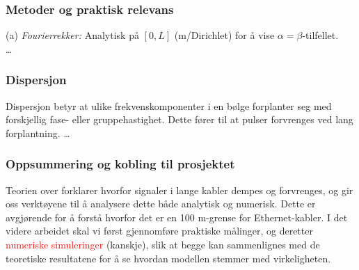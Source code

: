 \subsubsection{Metoder og praktisk relevans}

(a) \textit{Fourierrekker:} Analytisk på $[0,L]$ (m/Dirichlet) for å vise $\alpha=\beta$-tilfellet.\\
\dots
\clearpage
\subsubsection{Dispersjon}

Dispersjon betyr at ulike frekvenskomponenter i en bølge forplanter seg med forskjellig fase- eller gruppehastighet. Dette fører til at pulser forvrenges ved lang forplantning. 
\dots

\subsubsection{Oppsummering og kobling til prosjektet}

Teorien over forklarer hvorfor signaler i lange kabler dempes og forvrenges, og gir oss verktøyene til å analysere dette både analytisk og numerisk. Dette er avgjørende for å forstå hvorfor det er en 100 m-grense for Ethernet-kabler. I det videre arbeidet skal vi først gjennomføre praktiske målinger, og deretter \textcolor{red}{numeriske simuleringer} (kanskje), slik at begge kan sammenlignes med de teoretiske resultatene for å se hvordan modellen stemmer med virkeligheten.
